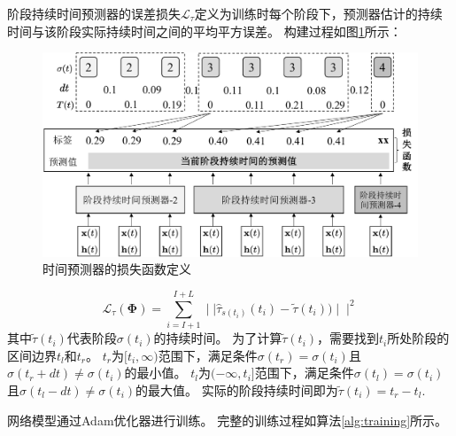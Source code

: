 阶段持续时间预测器的误差损失$\mathcal{L}_{\tau}$定义为训练时每个阶段下，预测器估计的持续时间与该阶段实际持续时间之间的平均平方误差。
构建过程如图\ref{fig:dt_label}所示：
\begin{figure}
    \centering
    \includegraphics[width=0.8\linewidth]{figures/chapter4/dt_label.pdf}
    \caption{时间预测器的损失函数定义}
    \label{fig:dt_label}
\end{figure}
\begin{equation}
    \mathcal{L}_{\tau}(\boldsymbol \Phi) =\sum_{i=I+1}^{I+L} \mid\mid\hat{\tau}_{s(t_i) }(t_i)-\tilde {\tau}(t_i))\mid\mid^2
\end{equation}
其中$\tilde {\tau}(t_i)$代表阶段$\sigma(t_i)$的持续时间。
为了计算$\tilde {\tau}(t_i)$，需要找到$t_i$所处阶段的区间边界$t_l$和$t_r$。
$t_r$为$[t_i, \infty)$范围下，满足条件$\sigma(t_r)=\sigma(t_i)$且$\sigma(t_r+dt)\neq \sigma(t_i)$的最小值。
$t_l$为$(-\infty, t_i]$范围下，满足条件$\sigma(t_l)=\sigma(t_i)$且$\sigma(t_l-dt)\neq \sigma(t_i)$的最大值。
实际的阶段持续时间即为$\tilde {\tau}(t_i)=t_r-t_l$.


网络模型通过Adam优化器进行训练。
完整的训练过程如算法\ref{alg:training}所示。

